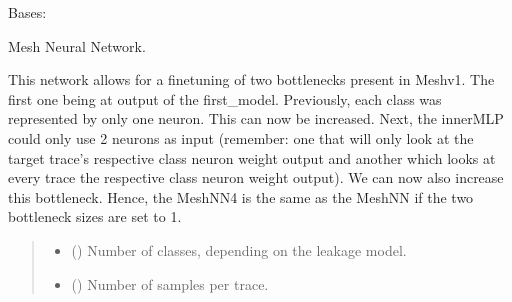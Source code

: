 \documentclass[letterpaper,10pt,english]{sphinxmanual}
\begin{document}
\begin{fulllineitems}
\label{\detokenize{MLSCAlib.Architectures:MLSCAlib.Architectures.torch_models.MeshNN}}
\pysigstartsignatures
{}
\pysigstopsignatures
\sphinxAtStartPar
Bases: 

\sphinxAtStartPar
Mesh Neural Network.

\sphinxAtStartPar
This network allows for a fine\sphinxhyphen{}tuning of two bottlenecks present in Meshv1.
The first one being at output of the first\_model. Previously, each class
was represented by only one neuron. This can now be increased. Next, the
inner\sphinxhyphen{}MLP could only use 2 neurons as input (remember: one that will only
look at the target trace’s respective class neuron weight output and another
which looks at every trace the respective class neuron weight output). We can
now also increase this bottleneck. Hence, the MeshNN4 is the same as the
MeshNN if the two bottleneck sizes are set to 1.
\begin{quote}\begin{description}
\begin{itemize}
\item {} 
\sphinxAtStartPar
{} () \textendash{} Number of classes, depending on the leakage model.

\item {} 
\sphinxAtStartPar
{} () \textendash{} Number of samples per trace.


\end{itemize}
\end{description}
\end{quote}
\end{fulllineitems}
\end{document}

